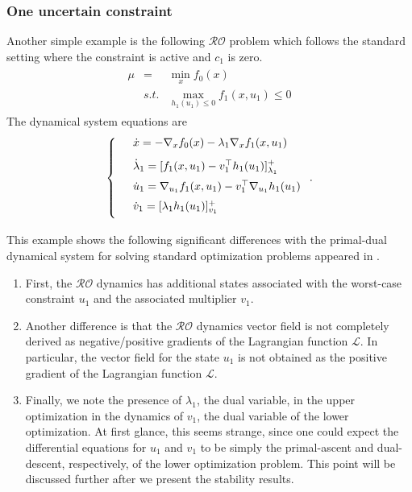 \documentclass[journal,twoside,web]{ieeecolor}
\newcommand{\rev}[1]{\textcolor{revisionblue}{#1}}
\begin{document}
\subsubsection{One uncertain constraint}
Another simple example is the following $\mathcal{RO}$ problem which follows the standard setting where the constraint is active and $c_1$ is zero.
\begin{align*}
\begin{array}{lcl}\mu&=&\displaystyle\min_x f_0(x)\\
&s.t.&\displaystyle \max_{h_1(u_1)\leq 0}f_1(x,u_1)\leq 0
\end{array}
\end{align*}
The dynamical system equations are
\begin{align*}
\left\{
\begin{array}{cl}
\vspace{3mm}
&\dot{x}=-\nabla_x f_0(x)-\lambda_1 \nabla_x f_1(x,u_1)\\
\vspace{2mm}
&\dot{\lambda}_1=[f_1(x,u_1)-v_1^\top h_1(u_1)]_{\lambda_1}^+\\
\vspace{2mm}
&\dot{u}_1=\nabla_{u_1} f_1(x,u_1)-v_1^\top \nabla_{u_1}h_1(u_1)\\
\vspace{2mm}
&\dot{v}_1=[\lambda_1h_1(u_1)]_{v_1}^+
\end{array}\right..
\end{align*}

This example shows the following significant differences with the primal-dual dynamical system for solving standard optimization problems appeared in \cite{feijer2010,cherukuri2016}.
\begin{enumerate}
\item First, the $\mathcal{RO}$ dynamics has additional states associated with the worst-case constraint \rev{$u_1$} and the associated multiplier $v_1$.
\item Another difference is that the $\mathcal{RO}$ dynamics vector field is not completely derived as negative/positive gradients of the Lagrangian function $\mathcal{L}$. In particular, the vector field for the state $u_1$ is not obtained as the positive gradient of the Lagrangian function $\mathcal{L}$.
\item Finally, we note the presence of $\lambda_1$, the dual variable, in the upper optimization in the dynamics of $v_1$, the dual variable of the lower optimization. At first glance, this seems strange, since one could expect the differential equations for $u_1$ and $v_1$ to be simply the primal-ascent and dual-descent, respectively, of the lower optimization problem. This point will be discussed further after we present the stability results.
\end{enumerate}
\end{document}
